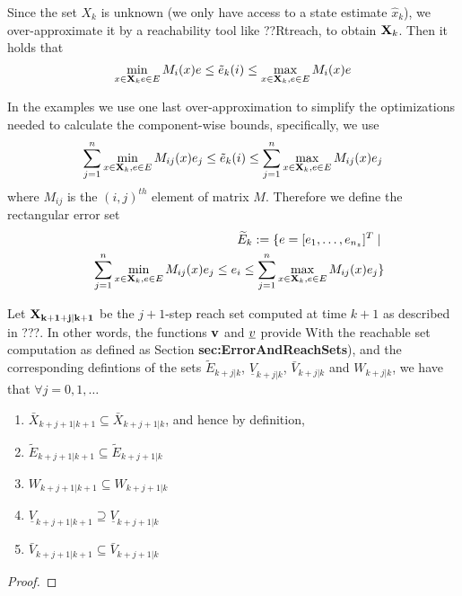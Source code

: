 Since the set $X_k$ is unknown (we only have access to a state estimate $\hat{x}_k$), we over-approximate it by a reachability tool like ??Rtreach, to obtain $\mathbf{X}_k$.
Then it holds that 
\[\min_{x \in \mathbf{X}_k e \in E}M_i(x)e \leq \tilde{e}_{k}(i) \leq \max_{x \in \mathbf{X}_k, e \in E} M_i(x)e\]

In the examples we use one last over-approximation to simplify the optimizations needed to calculate the component-wise bounds, specifically, we use 
\[\sum_{j=1}^{n} \min_{x \in \mathbf{X}_k, e \in E} M_{ij}(x)e_j  \leq \tilde{e}_{k}(i) \leq \sum_{j=1}^{n} \max_{x \in \mathbf{X}_k, e \in E} M_{ij}(x)e_j\]
where $M_{ij}$ is the $(i,j)^{th}$ element of matrix $M$.
Therefore we define the rectangular error set 
\begin{eqnarray}
\label{eq:Etilde}
&&\widetilde{E}_{k} := \{e = [e_1,\ldots, e_{n_z}]^T \;|\; 
\nonumber
\\
 &&\sum_{j=1}^{n} \min_{x \in \mathbf{X}_k, e \in E} M_{ij}(x)e_j  \leq e_i \leq \sum_{j=1}^{n} \max_{x \in \mathbf{X}_k, e \in E} M_{ij}(x)e_j\}
 \nonumber
 \\
\end{eqnarray}


\begin{lemma}
	\label{lem:set inclusions}
	Let $\mathbf{X_{k+1+j|k+1}}$ be the $j+1$-step reach set computed at time $k+1$ as described in ???.
	In other words, the functions $\mathbf{v}$ and $\underline{v}$ provide 
	With the reachable set computation as defined as Section \textbf{sec:ErrorAndReachSets}), and the corresponding defintions of the sets $\tilde{E}_{k+j|k}$, $\underline{V}_{k+j|k}$, $\bar{V}_{k+j|k}$ and $W_{k+j|k}$, we have that $\forall j=0,1,\dotsc$
	\begin{enumerate}
		\item $\bar{X}_{k+j+1|k+1} \subseteq \bar{X}_{k+j+1|k}$, and hence by definition,
		\item $\tilde{E}_{k+j+1|k+1} \subseteq \tilde{E}_{k+j+1|k}$
		\item ${W}_{k+j+1|k+1} \subseteq {W}_{k+j+1|k}$
		\item $\underline{V}_{k+j+1|k+1} \supseteq \underline{V}_{k+j+1|k}$
		\item $\bar{V}_{k+j+1|k+1} \subseteq \bar{V}_{k+j+1|k}$
	\end{enumerate}
\end{lemma} 
\begin{proof}
	
	\end{proof}
